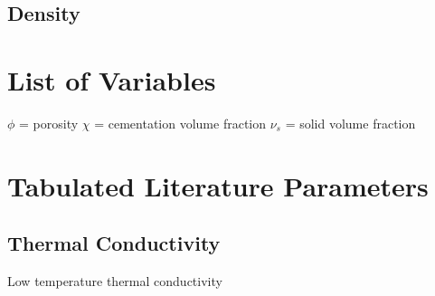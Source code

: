 \documentclass[11pt]{article} %
\begin{document}
\subsection{Density}

\section{List of Variables}
$\phi$ = porosity
$\chi$ = cementation volume fraction
$\nu_{s}$ = solid volume fraction

\section{Tabulated Literature Parameters}
\label{sec:tabulated}
	
\subsection{Thermal Conductivity}
\label{sec:tconductivity}
	
	Low temperature thermal conductivity
	
\end{document}
